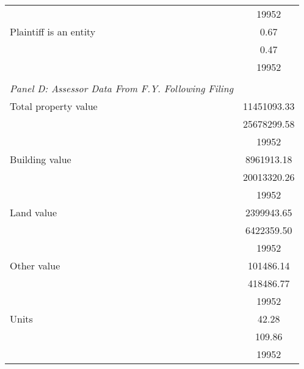 \begin{table}[htbp]
\begin{tabular}{l*{1}{c}}
                    &       19952\\
\hspace{0.25cm}Plaintiff is an entity&        0.67\\
                    &        0.47\\
                    &       19952\\
\vspace{0.1em} \\ \emph{Panel D: Assessor Data From F.Y. Following Filing}&            \\
\hspace{0.25cm}Total property value& 11451093.33\\
                    & 25678299.58\\
                    &       19952\\
\hspace{0.25cm}Building value&  8961913.18\\
                    & 20013320.26\\
                    &       19952\\
\hspace{0.25cm}Land value&  2399943.65\\
                    &  6422359.50\\
                    &       19952\\
\hspace{0.25cm}Other value&   101486.14\\
                    &   418486.77\\
                    &       19952\\
\hspace{0.25cm}Units&       42.28\\
                    &      109.86\\
                    &       19952\\
\bottomrule
\end{tabular}
\end{table}
